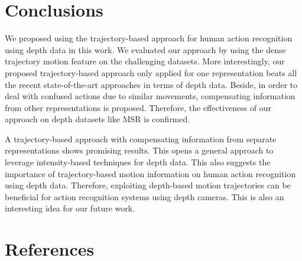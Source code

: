 \documentclass[review]{elsarticle}
\begin{document}
\section{Conclusions}
\label{lbl:Conclusions}

We proposed using the trajectory-based approach for human action recognition using depth data in this work. We evaluated our approach by using the dense trajectory motion feature on the challenging datasets. More interestingly, our proposed trajectory-based approach only applied for one representation beats all the recent state-of-the-art approaches in terms of depth data. Beside, in order to deal with confused actions due to similar movements, compensating information from other representations is proposed. Therefore, the effectiveness of our approach on depth datasets like MSR is confirmed.

A trajectory-based approach with compensating information from separate representations shows promising results. This opens a general approach to leverage intensity-based techniques for depth data. This also suggests the importance of trajectory-based motion information on human action recognition using depth data. Therefore, exploiting depth-based motion trajectories can be beneficial for action recognition systems using depth cameras. This is also an interesting idea for our future work.

\section*{References}



\end{document}
